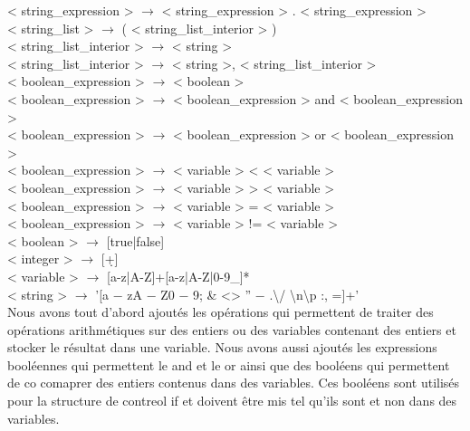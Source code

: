 \documentclass[a4paper,10pt]{article}
\begin{document}
< string\_expression > $\rightarrow$ < string\_expression > . < string\_expression > \\
< string\_list > $\rightarrow$ ( < string\_list\_interior > ) \\
< string\_list\_interior > $\rightarrow$ < string >\\
< string\_list\_interior > $\rightarrow$ < string >, < string\_list\_interior > \\
< boolean\_expression > $\rightarrow$ < boolean > \\
< boolean\_expression > $\rightarrow$ < boolean\_expression > and < boolean\_expression > \\
< boolean\_expression > $\rightarrow$ < boolean\_expression > or < boolean\_expression > \\
< boolean\_expression > $\rightarrow$ < variable > < < variable >\\
< boolean\_expression > $\rightarrow$ < variable > > < variable >\\
< boolean\_expression > $\rightarrow$ < variable > = < variable >\\
< boolean\_expression > $\rightarrow$ < variable > != < variable >\\
< boolean > $\rightarrow$ [true|false]\\
< integer > $\rightarrow$ [\d+] \\
< variable > $\rightarrow$ [a-z|A-Z]+[a-z|A-Z|0-9\_]*\\
< string > $\rightarrow$ '[a − zA − Z0 − 9; \& <> ” − .\textbackslash / \textbackslash n\textbackslash p :, =]+' \\

Nous avons tout d'abord  ajoutés les opérations qui permettent de traiter des opérations arithmétiques sur des entiers ou des variables contenant des entiers et 
stocker le résultat dans une variable. Nous avons aussi ajoutés les expressions booléennes qui permettent le and et le or ainsi que des booléens qui permettent de co
comaprer des entiers contenus dans des variables. Ces booléens sont utilisés pour la structure de contreol if et doivent être mis tel qu'ils sont et non dans 
des variables.
\end{document}
